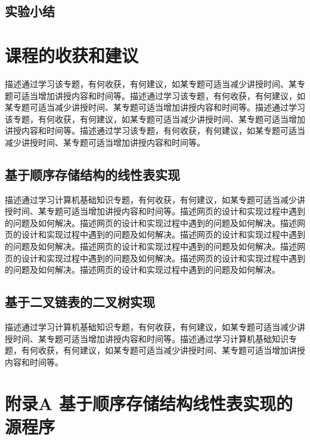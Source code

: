 \documentclass[supercite]{Experimental_Report}
\theoremstyle{definition}
\begin{document}
\subsection{实验小结}

\newpage

\section{课程的收获和建议}

描述通过学习该专题，有何收获，有何建议，如某专题可适当减少讲授时间、某专题可适当增加讲授内容和时间等。描述通过学习该专题，有何收获，有何建议，如某专题可适当减少讲授时间、某专题可适当增加讲授内容和时间等。描述通过学习该专题，有何收获，有何建议，如某专题可适当减少讲授时间、某专题可适当增加讲授内容和时间等。描述通过学习该专题，有何收获，有何建议，如某专题可适当减少讲授时间、某专题可适当增加讲授内容和时间等。

\subsection{基于顺序存储结构的线性表实现}

描述通过学习计算机基础知识专题，有何收获，有何建议，如某专题可适当减少讲授时间、某专题可适当增加讲授内容和时间等。描述网页的设计和实现过程中遇到的问题及如何解决。描述网页的设计和实现过程中遇到的问题及如何解决。描述网页的设计和实现过程中遇到的问题及如何解决。描述网页的设计和实现过程中遇到的问题及如何解决。描述网页的设计和实现过程中遇到的问题及如何解决。描述网页的设计和实现过程中遇到的问题及如何解决。描述网页的设计和实现过程中遇到的问题及如何解决。描述网页的设计和实现过程中遇到的问题及如何解决。

\subsection{基于二叉链表的二叉树实现}

描述通过学习计算机基础知识专题，有何收获，有何建议，如某专题可适当减少讲授时间、某专题可适当增加讲授内容和时间等。描述通过学习计算机基础知识专题，有何收获，有何建议，如某专题可适当减少讲授时间、某专题可适当增加讲授内容和时间等。


\nocite{*} %



\setcounter{secnumdepth}{0}
\appendix

\section{附录A 基于顺序存储结构线性表实现的源程序}
\end{document}
